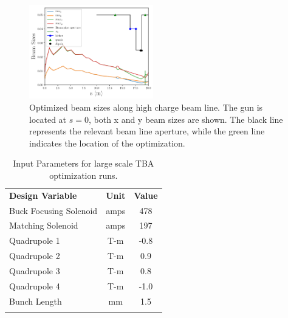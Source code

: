 \begin{figure}
	\includegraphics[width=0.48\textwidth]{../pareto_stat_plots/xy-max-min-sigma-paper}
	\caption{Optimized beam sizes along high charge beam line. The gun is located at $s=0$, 
	both x and y beam sizes are shown. The black line represents the relevant beam line aperture, while
	the green line indicates the location of the optimization.}
	\label{fig:stat}
\end{figure}
\begin{table}%
	\begin{center}
		\caption{Input Parameters for large scale TBA optimization runs.}
		\label{tab:designopt}   
		\begin{tabular}{l|c|c}
			\noalign{\smallskip}\hline\noalign{\smallskip}
			\textbf{Design Variable} & \textbf{Unit}	&  \textbf{Value}  \\ 
			\noalign{\smallskip}\hline\noalign{\smallskip}
			{Buck Focusing Solenoid} & amps	& 478 \\
			Matching Solenoid &	amps	& 197	  \\
			Quadrupole 1& T-m		& -0.8	\\ 
			Quadrupole 2& T-m		& 0.9	\\
			Quadrupole 3 & T-m		& 0.8	\\
			Quadrupole 4 & T-m		& -1.0	\\ 
			Bunch Length & mm 		& 1.5	\\
			\noalign{\smallskip}\hline\noalign{\smallskip}
		\end{tabular}
	\end{center}
\end{table}








